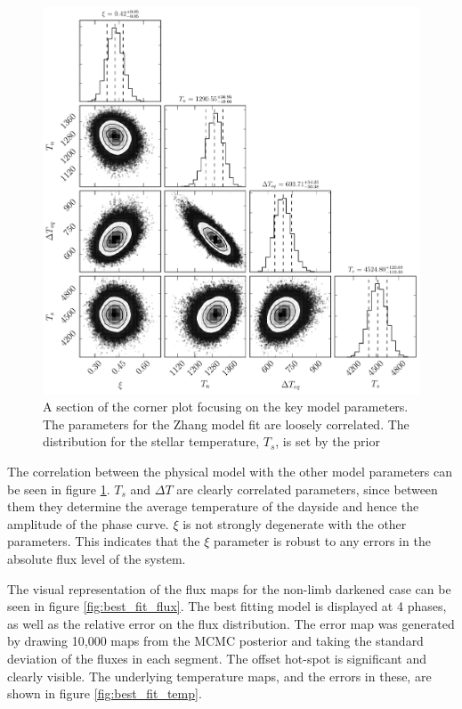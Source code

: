 \documentclass[a4paper,fleqn,usenatbib]{mnras}
\begin{document}
\begin{figure}
\begin{center}
\includegraphics[width=\columnwidth]{img/free_parameterstriangle.pdf}
\caption{A section of the corner plot focusing on the key model parameters. The parameters for the Zhang model fit are loosely correlated. The distribution for the stellar temperature, $T_s$, is set by the prior}
\label{fig:triangle corner sub}
\end{center}
\end{figure}

The correlation between the physical model with the other model parameters can be seen in figure \ref{fig:triangle corner sub}. $T_s$ and $\Delta T$ are clearly correlated parameters, since between them they determine the average temperature of the dayside and hence the amplitude of the phase curve. $\xi$ is not strongly degenerate with the other parameters. This indicates that the $\xi$ parameter is robust to any errors in the absolute flux level of the system.

The visual representation of the flux maps for the non-limb darkened case can be seen in figure \ref{fig:best_fit_flux}. The best fitting model is displayed at 4 phases, as well as the relative error on the flux distribution. The error map was generated by drawing 10,000 maps from the MCMC posterior and taking the standard deviation of the fluxes in each segment. The offset hot-spot is significant and clearly visible. The underlying temperature maps, and the errors in these, are shown in figure \ref{fig:best_fit_temp}.
\end{document}
